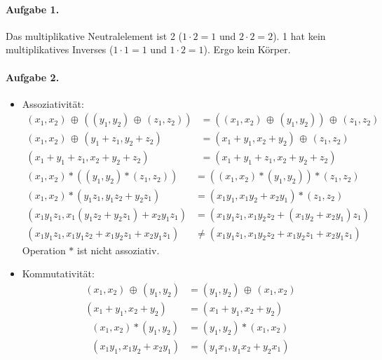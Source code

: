 \documentclass{article}
\newcommand{\xor}{\, \oplus\, }
\begin{document}
\paragraph{Aufgabe 1.}

Das multiplikative Neutralelement ist 2 ($1 \cdot 2 = 1$ und $2 \cdot 2 = 2$). 1 hat kein multiplikatives Inverses ($1 \cdot 1 = 1$ und $1 \cdot 2 = 1$). Ergo kein Körper.

\paragraph{Aufgabe 2.}

\begin{itemize}
    \item Assoziativität:
    \begin{align*}
        (x_1, x_2) \xor ((y_1, y_2) \xor (z_1, z_2)) &= ((x_1, x_2) \xor (y_1, y_2)) \xor (z_1, z_2) \\
        (x_1, x_2) \xor (y_1 + z_1, y_2 + z_2) &= (x_1 + y_1, x_2 + y_2) \xor (z_1, z_2) \\
        (x_1 + y_1 + z_1, x_2 + y_2 + z_2) &= (x_1 + y_1 + z_1, x_2 + y_2 + z_2)
    \end{align*}
    \begin{align*}
        (x_1, x_2) * ((y_1, y_2) * (z_1, z_2)) &= ((x_1, x_2) * (y_1, y_2)) * (z_1, z_2) \\
        (x_1, x_2) * (y_1z_1, y_1z_2 + y_2z_1) &= (x_1y_1, x_1y_2 + x_2y_1) * (z_1, z_2) \\
        (x_1y_1z_1, x_1(y_1z_2 + y_2z_1) + x_2y_1z_1) &= (x_1y_1z_1, x_1y_2z_2 + (x_1y_2 + x_2y_1)z_1) \\
        (x_1y_1z_1, x_1y_1z_2 + x_1y_2z_1 + x_2y_1z_1) &\neq (x_1y_1z_1, x_1y_2z_2 + x_1y_2z_1 + x_2y_1z_1)
    \end{align*}
    Operation $*$ ist nicht assoziativ.

    \item Kommutativität:
    \begin{align*}
        (x_1, x_2) \xor (y_1, y_2) &= (y_1, y_2) \xor (x_1, x_2) \\
        (x_1 + y_1, x_2 + y_2) &= (x_1 + y_1, x_2 + y_2)
    \end{align*}
    \begin{align*}
        (x_1, x_2) * (y_1, y_2) &= (y_1, y_2) * (x_1, x_2) \\
        (x_1y_1, x_1y_2 + x_2y_1) &= (y_1x_1, y_1x_2 + y_2x_1)
    \end{align*}


\end{itemize}
\end{document}
